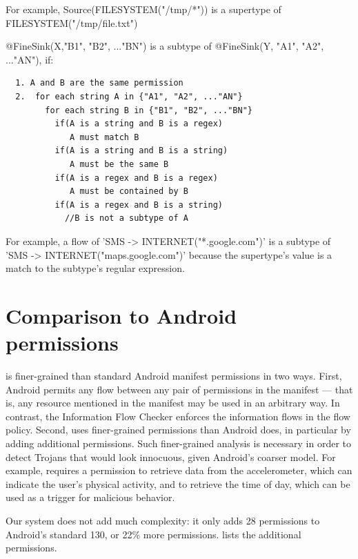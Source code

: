 For example, Source(FILESYSTEM("/tmp/*")) is a supertype of FILESYSTEM("/tmp/file.txt")\newline

\noindent
@FineSink(X,{"B1", "B2", ..."BN"}) is a subtype of @FineSink(Y, {"A1", "A2", ..."AN"}), 
if:
\begin{Verbatim}
  1. A and B are the same permission
  2.  for each string A in {"A1", "A2", ..."AN"}
        for each string B in {"B1", "B2", ..."BN"}
          if(A is a string and B is a regex)
             A must match B
          if(A is a string and B is a string)
             A must be the same B
          if(A is a regex and B is a regex)
             A must be contained by B
          if(A is a regex and B is a string)
            //B is not a subtype of A
\end{Verbatim}
For example, a flow of 'SMS -> INTERNET("*.google.com")' is a subtype of 
'SMS -> INTERNET("maps.google.com")' because the supertype's value is a match to 
the subtype's regular expression.

\section{Comparison to Android permissions}
\label{sec:permissions}


\TheFlowChecker is finer-grained than standard Android manifest permissions
in two ways.  First, Android permits any flow
between any pair of permissions in the manifest --- that is, any resource
mentioned in the manifest may be used in an arbitrary way.
  In contrast, the Information Flow Checker enforces the information flows in the flow policy.
Second,
\theFlowChecker uses finer-grained permissions than Android does, in
particular by adding additional permissions.
Such finer-grained analysis is necessary in order to detect Trojans that would 
look innocuous, given Android's coarser model.
For example, \theFlowChecker requires 
a permission to retrieve data from the accelerometer, which can indicate the user's
physical activity, and to retrieve the time of day, which can be used
as a trigger for malicious behavior.

Our system does not add much complexity:  it only adds 28 permissions to
Android's standard 130, or 22\% more permissions.   lists
the additional permissions.


